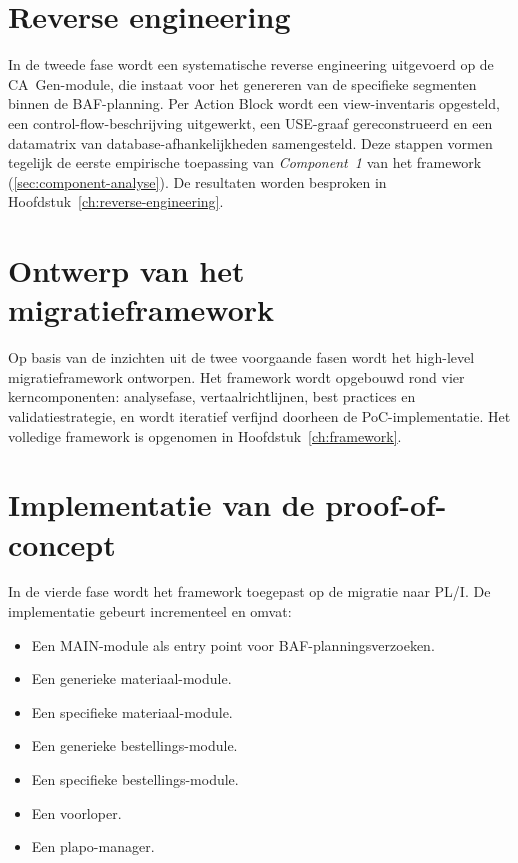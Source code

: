 \section{Reverse engineering}
\label{sec:meth-reverse}

In de tweede fase wordt een systematische reverse engineering uitgevoerd op de CA~Gen-module, die instaat voor het genereren van de specifieke segmenten binnen de BAF-planning. Per
Action Block wordt een view-inventaris opgesteld, een control-flow-beschrijving uitgewerkt, een
USE-graaf gereconstrueerd en een datamatrix van database-afhankelijkheden samengesteld. Deze stappen vormen
tegelijk de eerste empirische toepassing van \emph{Component~1} van het framework
(\autoref{sec:component-analyse}). De resultaten worden besproken in
Hoofdstuk~\ref{ch:reverse-engineering}.

\section{Ontwerp van het migratieframework}
\label{sec:meth-framework}

Op basis van de inzichten uit de twee voorgaande fasen wordt het high-level migratieframework ontworpen.
Het framework wordt opgebouwd rond vier kerncomponenten: analysefase, vertaalrichtlijnen, best practices
en validatiestrategie, en wordt iteratief verfijnd doorheen de PoC-implementatie. Het volledige framework
is opgenomen in Hoofdstuk~\ref{ch:framework}.

\section{Implementatie van de proof-of-concept}
\label{sec:meth-poc}

In de vierde fase wordt het framework toegepast op de migratie naar PL/I. De
implementatie gebeurt incrementeel en omvat:
\begin{itemize}
    \item Een MAIN-module als entry point voor BAF-planningsverzoeken.
    \item Een generieke materiaal-module.
    \item Een specifieke materiaal-module.
    \item Een generieke bestellings-module.
    \item Een specifieke bestellings-module.
    \item Een voorloper.
    \item Een plapo-manager.
\end{itemize}

